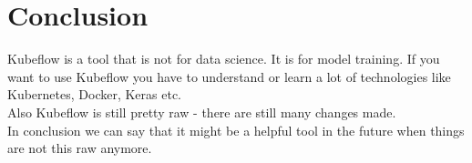 \documentclass[12pt,a4paper]{scrartcl}		%
\begin{document}
\section{Conclusion}

\noindent Kubeflow is a tool that is not for data science. It is for model training. 
If you want to use Kubeflow you have to understand or learn a lot of technologies like Kubernetes, Docker, Keras etc. \\
Also Kubeflow is still pretty raw - there are still many changes made. \\
In conclusion we can say that it might be a helpful tool in the future when things are not this raw anymore. 
\end{document}
